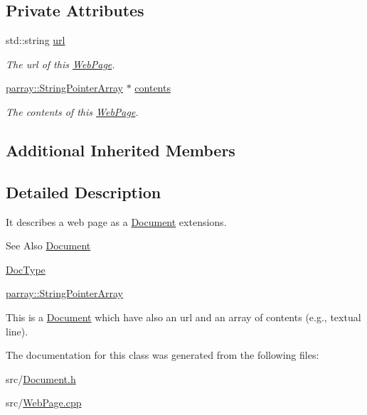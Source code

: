 \subsection*{Private Attributes}
\begin{DoxyCompactItemize}
\item 
\hypertarget{classdocs_1_1WebPage_a4495e463a26d77b22ec4d8af690bbb11}{std\-::string \hyperlink{classdocs_1_1WebPage_a4495e463a26d77b22ec4d8af690bbb11}{url}}\label{classdocs_1_1WebPage_a4495e463a26d77b22ec4d8af690bbb11}

\begin{DoxyCompactList}\small\item\em The url of this \hyperlink{classdocs_1_1WebPage}{Web\-Page}. \end{DoxyCompactList}\item 
\hypertarget{classdocs_1_1WebPage_a67d46a145ff4e7093fb1b8f56e539895}{\hyperlink{classparray_1_1StringPointerArray}{parray\-::\-String\-Pointer\-Array} $\ast$ \hyperlink{classdocs_1_1WebPage_a67d46a145ff4e7093fb1b8f56e539895}{contents}}\label{classdocs_1_1WebPage_a67d46a145ff4e7093fb1b8f56e539895}

\begin{DoxyCompactList}\small\item\em The contents of this \hyperlink{classdocs_1_1WebPage}{Web\-Page}. \end{DoxyCompactList}\end{DoxyCompactItemize}
\subsection*{Additional Inherited Members}


\subsection{Detailed Description}
It describes a web page as a \hyperlink{classdocs_1_1Document}{Document} extensions. 

\begin{DoxySeeAlso}{See Also}
\hyperlink{classdocs_1_1Document}{Document} 

\hyperlink{classdocs_1_1DocType}{Doc\-Type} 

\hyperlink{classparray_1_1StringPointerArray}{parray\-::\-String\-Pointer\-Array}
\end{DoxySeeAlso}
This is a \hyperlink{classdocs_1_1Document}{Document} which have also an url and an array of contents (e.\-g., textual line). 

The documentation for this class was generated from the following files\-:\begin{DoxyCompactItemize}
\item 
src/\hyperlink{Document_8h}{Document.\-h}\item 
src/\hyperlink{WebPage_8cpp}{Web\-Page.\-cpp}\end{DoxyCompactItemize}
